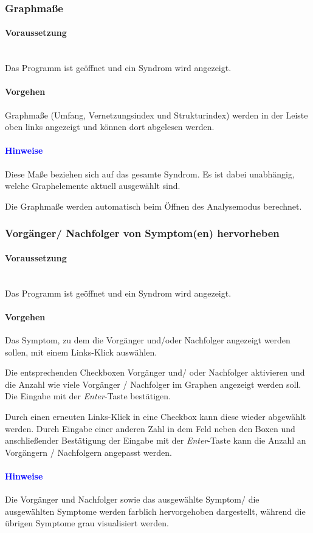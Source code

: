 \documentclass[enabledeprecatedfontcommands,fontsize=11pt,paper=a4,twoside]{scrartcl}
\newcounter{one}
\newcounter{two}[one]
\newcommand*{\hint}{\paragraph{\textcolor{blue}{Hinweise}}}
\newcommand*{\condition}{\paragraph{Voraussetzung}$\;$ \vspace{0.2cm}\\}
\newcommand*{\action}{\paragraph{Vorgehen}}
\let\tempone\itemize
\let\temptwo\enditemize
\renewenvironment{itemize}{\tempone\addtolength{\itemsep}{-10.0pt}}{\temptwo}
\let\origenumerate\enumerate
\let\origendenumerate\endenumerate
\renewenvironment{enumerate}{\origenumerate \addtolength{\itemsep}{-10.0pt}}{\origendenumerate}
\begin{document}
\newpage
\subsubsection{Graphmaße} 
	\condition 
	Das Programm ist geöffnet und ein Syndrom wird angezeigt.
	\action
	\begin{enumerate}
		\item Graphmaße (Umfang, Vernetzungsindex und Strukturindex) werden in der Leiste oben links angezeigt und können dort abgelesen werden.
	\end{enumerate} 
	\hint
	\begin{itemize}
		\item Diese Maße beziehen sich auf das gesamte Syndrom. Es ist dabei unabhängig, welche Graphelemente aktuell ausgewählt sind.
		\item Die Graphmaße werden automatisch beim Öffnen des Analysemodus berechnet. \\
	\end{itemize}

\subsubsection{Vorgänger/ Nachfolger von Symptom(en) hervorheben}
	\condition 
		Das Programm ist geöffnet und ein Syndrom wird angezeigt.
	\action
	\begin{enumerate}
		\item Das Symptom, zu dem die Vorgänger und/oder Nachfolger angezeigt werden sollen, mit einem Links-Klick auswählen.
		\item Die entsprechenden Checkboxen Vorgänger und/ oder Nachfolger aktivieren und die Anzahl wie viele Vorgänger / Nachfolger im Graphen angezeigt werden soll. Die Eingabe mit der \textit{Enter}-Taste bestätigen.
		\item Durch einen erneuten Links-Klick in eine Checkbox kann diese wieder abgewählt werden. Durch Eingabe einer anderen Zahl in dem Feld neben den Boxen und anschließender Bestätigung der Eingabe mit der \textit{Enter}-Taste kann die Anzahl an Vorgängern / Nachfolgern angepasst werden.
	\end{enumerate} 
	\hint
	\begin{itemize}
		\item Die Vorgänger und Nachfolger sowie das ausgewählte Symptom/ die ausgewählten Symptome werden farblich hervorgehoben dargestellt, während die übrigen Symptome grau visualisiert werden. \\
	\end{itemize}
\end{document}
